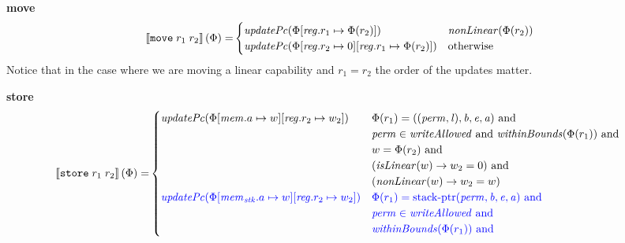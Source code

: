 \documentclass[a4paper]{article}
\newcommand{\sem}[1]{\left\llbracket #1 \right\rrbracket}
\newcommand{\tand}{\text{ and }}
\newcommand{\totherwise}{\text{otherwise }}
\newcommand{\sourcecolor}[1]{\color{blue}}
\newcommand{\src}[1]{{\sourcecolor{} #1}}
\newcommand{\targetcolor}[1]{\color{black}}
\newcommand{\trg}[1]{{\targetcolor{} #1}}
\newcommand{\zinstr}[1]{\texttt{#1}}
\newcommand{\twoinstr}[3]{
  \ifthenelse{\equal{#2#3}{}}
  {\zinstr{#1}}
  {\zinstr{#1} \; #2 \; #3}
}
\newcommand{\tmove}[2]{\twoinstr{\trg{move}}{#1}{#2}}
\newcommand{\tstore}[2]{\twoinstr{\trg{store}}{#1}{#2}}
\newcommand{\update}[2]{[#1 \mapsto #2]}
\newcommand{\updReg}[2]{\update{\reg.#1}{#2}}
\newcommand{\perm}{\var{perm}}
\newcommand{\lin}{\var{l}}
\newcommand{\stkptr}[1]{\mathrm{stack\text{-}ptr}(#1)}
\newcommand{\var}[1]{\mathit{#1}}
\newcommand{\reg}{\var{reg}}
\newcommand{\mem}{\var{mem}}
\newcommand{\stk}{\var{stk}}
\newcommand{\baddr}{\var{b}}
\newcommand{\eaddr}{\var{e}}
\newcommand{\aaddr}{\var{a}}
\newcommand{\plainfun}[2]{
  \ifthenelse{\equal{#2}{}}
  {\mathit{#1}}
  {\mathit{#1}(#2)}
}
\newcommand{\updPcAddr}[1]{\plainfun{updatePc}{#1}}
\newcommand{\writeAllowed}[1]{\plainfun{writeAllowed}{#1}}
\newcommand{\nonLinear}[1]{\plainfun{nonLinear}{#1}}
\newcommand{\isLinear}[1]{\plainfun{isLinear}{#1}}
\newcommand{\withinBounds}[1]{\plainfun{withinBounds}{#1}}
\begin{document}
\noindent\textbf{move}\\
\begin{align*}
  \sem{\tmove{r_1}{r_2}}(\Phi) = & 
                              \begin{cases}
                                \updPcAddr{\Phi\updReg{r_1}{\Phi(r_2)}} & \nonLinear{\Phi(r_2)}\\
                                \updPcAddr{\Phi\updReg{r_2}{0}\updReg{r_1}{\Phi(r_2)}} & \totherwise 
                              \end{cases}
\end{align*}
Notice that in the case where we are moving a linear capability and $r_1 = r_2$ the order of the updates matter.

\noindent\textbf{store}\\
\begin{align*}
  \sem{\tstore{r_1}{r_2}}(\Phi) = &
                                    \begin{cases}
                                      \updPcAddr{\Phi\update{\mem.a}{w}\updReg{r_2}{w_2}} & 
                                      \arraycolsep=0pt
                                      \begin{array}[t]{l}
                                        \Phi(r_1) = ((\perm,\lin),\baddr,\eaddr,\aaddr) \tand \\
                                        \perm \in \writeAllowed{} \tand \withinBounds{\Phi(r_1)} \tand \\
                                        w = \Phi(r_2) \tand \\
                                        (\isLinear{w} \rightarrow w_2 = 0) \tand \\
                                        (\nonLinear{w} \rightarrow w_2 = w)
                                      \end{array}
                                      \\
                                      \src{\updPcAddr{\Phi\update{\mem_\stk.a}{w}\updReg{r_2}{w_2}}} & 
                                      \arraycolsep=0pt
                                      \begin{array}[t]{l}
                                        \src{\Phi(r_1) = \stkptr{\perm,\baddr,\eaddr,\aaddr} \tand} \\
                                        \src{\perm \in \writeAllowed{} \tand} \\
                                        \src{\withinBounds{\Phi(r_1)} \tand} \\

\end{array}
\end{cases}
\end{align*}
\end{document}
